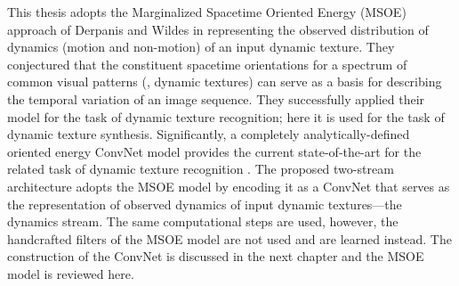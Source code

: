 This thesis adopts the Marginalized Spacetime Oriented Energy (MSOE) approach of Derpanis and Wildes \cite{derpanis2012spacetime} in representing the observed distribution of dynamics (\ie motion and non-motion) of an input dynamic texture. They conjectured that the constituent spacetime orientations for a spectrum of common
visual patterns (\eg, dynamic textures) can serve as a basis for describing the temporal
variation of an image sequence. They successfully applied their model for the task of dynamic texture recognition; here it is used for the task of dynamic texture synthesis. Significantly, a completely analytically-defined
oriented energy ConvNet model provides the current state-of-the-art
for the related task of dynamic texture recognition \cite{hadji2017}. The proposed two-stream architecture adopts the MSOE model by encoding it as a ConvNet that serves as the representation of observed dynamics of input dynamic textures---the dynamics stream. The same computational steps are used, however, the handcrafted filters of the MSOE model are not used and are learned instead. The construction of the ConvNet is discussed in the next chapter and the MSOE model is reviewed here.

